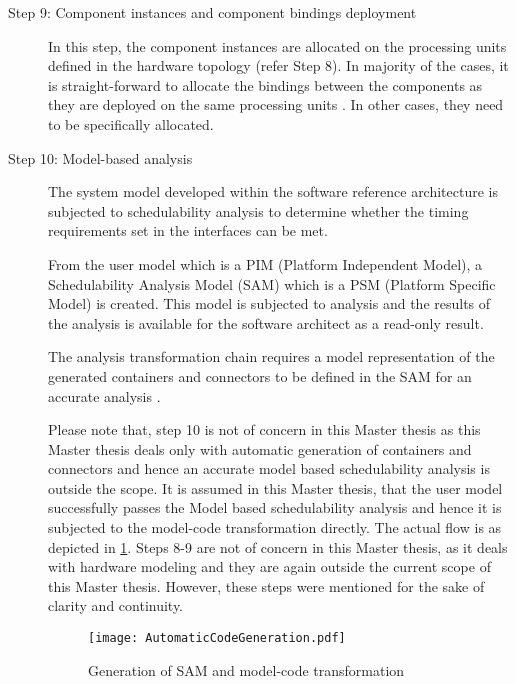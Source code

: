 \begin{description}
\item [Step 9: Component instances and component bindings deployment] In this step, the component instances are allocated on the processing units defined in the hardware topology (refer Step 8). In majority of the cases, it is straight-forward to allocate the bindings between the components as they are deployed on the same processing units \cite{CompBasedProcess}. In other cases, they need to be specifically allocated.

\item [Step 10: Model-based analysis] The system model developed within the software reference architecture is subjected to schedulability analysis to determine whether the timing requirements set in the interfaces can be met.

From the user model which is a PIM (Platform Independent Model), a Schedulability Analysis Model (SAM) which is a PSM (Platform Specific Model) is created. This model is subjected to analysis and the results of the analysis is available for the software architect as a read-only result. 

The analysis transformation chain requires a model representation of the generated containers and connectors to be defined in the SAM for an accurate analysis \cite{CompBasedProcess}.

Please note that, step 10 is not of concern in this Master thesis as this Master thesis deals only with automatic generation of containers and connectors and hence an accurate model based schedulability analysis is outside the scope. It is assumed in this Master thesis, that the user model successfully passes the Model based schedulability analysis and hence it is subjected to the model-code transformation directly. The actual flow is as depicted in \cref{fig: Automatic code generation}. Steps 8-9 are not of concern in this Master thesis, as it deals with hardware modeling and they are again outside the current scope of this Master thesis. However, these steps were mentioned for the sake of clarity and continuity.

\begin{figure}[h]
	\centering
	\texttt{[image: AutomaticCodeGeneration.pdf]}
	\caption{Generation of SAM and model-code transformation}
	\label{fig: Automatic code generation}
\end{figure}


\end{description}
